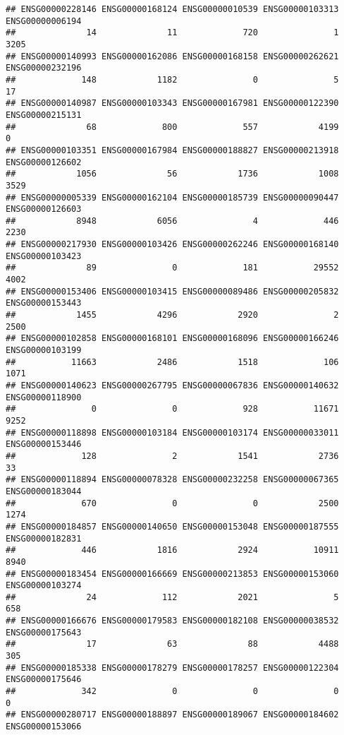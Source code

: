 \documentclass[
]{article}
\begin{document}
\begin{verbatim}
## ENSG00000228146 ENSG00000168124 ENSG00000010539 ENSG00000103313 ENSG00000006194 
##              14              11             720               1            3205 
## ENSG00000140993 ENSG00000162086 ENSG00000168158 ENSG00000262621 ENSG00000232196 
##             148            1182               0               5              17 
## ENSG00000140987 ENSG00000103343 ENSG00000167981 ENSG00000122390 ENSG00000215131 
##              68             800             557            4199               0 
## ENSG00000103351 ENSG00000167984 ENSG00000188827 ENSG00000213918 ENSG00000126602 
##            1056              56            1736            1008            3529 
## ENSG00000005339 ENSG00000162104 ENSG00000185739 ENSG00000090447 ENSG00000126603 
##            8948            6056               4             446            2230 
## ENSG00000217930 ENSG00000103426 ENSG00000262246 ENSG00000168140 ENSG00000103423 
##              89               0             181           29552            4002 
## ENSG00000153406 ENSG00000103415 ENSG00000089486 ENSG00000205832 ENSG00000153443 
##            1455            4296            2920               2            2500 
## ENSG00000102858 ENSG00000168101 ENSG00000168096 ENSG00000166246 ENSG00000103199 
##           11663            2486            1518             106            1071 
## ENSG00000140623 ENSG00000267795 ENSG00000067836 ENSG00000140632 ENSG00000118900 
##               0               0             928           11671            9252 
## ENSG00000118898 ENSG00000103184 ENSG00000103174 ENSG00000033011 ENSG00000153446 
##             128               2            1541            2736              33 
## ENSG00000118894 ENSG00000078328 ENSG00000232258 ENSG00000067365 ENSG00000183044 
##             670               0               0            2500            1274 
## ENSG00000184857 ENSG00000140650 ENSG00000153048 ENSG00000187555 ENSG00000182831 
##             446            1816            2924           10911            8940 
## ENSG00000183454 ENSG00000166669 ENSG00000213853 ENSG00000153060 ENSG00000103274 
##              24             112            2021               5             658 
## ENSG00000166676 ENSG00000179583 ENSG00000182108 ENSG00000038532 ENSG00000175643 
##              17              63              88            4488             305 
## ENSG00000185338 ENSG00000178279 ENSG00000178257 ENSG00000122304 ENSG00000175646 
##             342               0               0               0               0 
## ENSG00000280717 ENSG00000188897 ENSG00000189067 ENSG00000184602 ENSG00000153066 

\end{verbatim}
\end{document}
